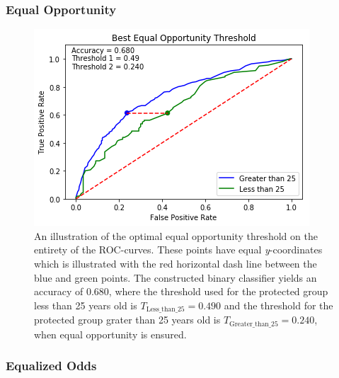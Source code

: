 \documentclass[11pt, fleqn, titlepage]{article}
\begin{document}
	\subsubsection{Equal Opportunity}
	
	\begin{figure}[H]
		\centering
		\includegraphics[width=0.5\linewidth]{"imgs/Equal Opportunity Optimal_age"}
		\caption{An illustration of the optimal equal opportunity threshold on the entirety of the ROC-curves. These points have equal \textit{y}-coordinates which is illustrated with the red horizontal dash line between the blue and green points. The constructed binary classifier yields an accuracy of $ 0.680 $, where the threshold used for the protected group less than 25 years old is $T_{\text{Less\_than\_25}}= 0.490 $ and the threshold for the protected group grater than 25 years old is $ T_{\text{Greater\_than\_25}}=0.240 $, when equal opportunity is ensured.}
		\label{fig:equal-opportunity-optimal}
	\end{figure}
	
	\subsubsection{Equalized Odds}
	
\end{document}
